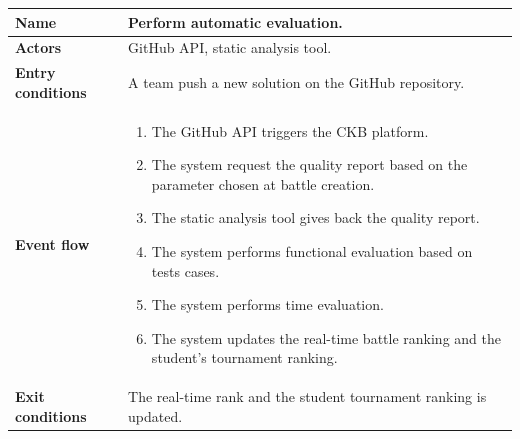\begin{enumerate}[label=\textbf{UC.\arabic*}]
\begin{table}[h]
    	    \centering
                \renewcommand{\arraystretch}{1.5}
                \begin{tabular}{|m{3.2cm}|m{9.8cm}|}
                    \hline
                    \textbf{Name} & Perform automatic evaluation. \\
                    \hline
                    \textbf{Actors} & GitHub API, static analysis tool. \\
                    \hline
                    \textbf{Entry conditions}  & A team push a new solution on the GitHub repository. \\
                    \hline
                    \textbf{Event flow}  & 
                    \begin{enumerate}[label=\arabic*.]
                        \item The GitHub API triggers the CKB platform.
                        \item The system request the quality report based on the parameter chosen at battle creation.
                        \item The static analysis tool gives back the quality report.
                        \item The system performs functional evaluation based on tests cases.
                        \item The system performs time evaluation.
                        \item The system updates the real-time battle ranking and the student's tournament ranking.
                    \end{enumerate}\\ 
                    \hline
                    \textbf{Exit conditions}  &  The real-time rank and the student tournament ranking is updated. \\
                    \hline
                \end{tabular}
        \end{table}
        \begin{figure}[h]
            \centering

\end{figure}
\end{enumerate}
